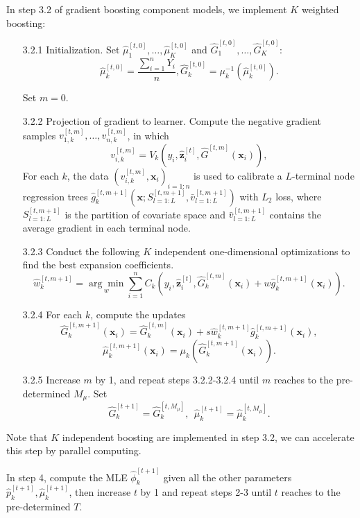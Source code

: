 \documentclass[11pt]{article}
\numberwithin{equation}{section}
\def\bx{\boldsymbol{x}}
\def\bz{\boldsymbol{z}}
\newcounter{saveenumi}
\newcommand{\seti}{\setcounter{saveenumi}{\value{enumi}}}
\begin{document}
In step 3.2 of gradient boosting component models, we implement $K$ weighted boosting:
	\begin{enumerate}
		\item[3.2.1] Initialization. Set $\hat{\mu}_1^{[t,0]},\ldots,\hat{\mu}_K^{[t,0]}$ and $\hat{G}_1^{[t,0]},\ldots,\hat{G}_K^{[t,0]}$:
			\begin{equation}\label{ini-2}
				\hat{\mu}_k^{[t,0]}=\frac{\sum_{i=1}^nY_i}{n}, \hat{G}_k^{[t,0]}=\mu_k^{-1}(\hat{\mu}_k^{[t,0]}).
			\end{equation}
		
		Set $m=0$.
		\item[3.2.2] Projection of gradient to learner.
		Compute the negative gradient samples $v_{1,k}^{[t,m]},\ldots,v_{n,k}^{[t,m]}$, in which
		$$v_{i,k}^{[t,m]}=V_k(y_i,\hat{\bz}^{[t]}_{i},\hat{G}^{[t,m]}(\bx_i)),$$
		For each $k$, the data $(v_{i,k}^{[t,m]},\bx_i)_{i=1:n}$ is used to calibrate a $L$-terminal node regression trees $\hat{g}_k^{[t,m+1]}\left(\bx;S^{[t,m+1]}_{l=1:L},\bar{v}^{[t,m+1]}_{l=1:L}\right)$ with $L_2$ loss, where $S^{[t,m+1]}_{l=1:L}$ is the partition of covariate space and $\bar{v}^{[t,m+1]}_{l=1:L}$ contains the average gradient in each terminal node.
		
	
	
		\item[3.2.3]  Conduct the following $K$ independent one-dimensional optimizations to find the best expansion coefficients.
		$$\hat{w}_{k}^{[t,m+1]}=\underset{w}{\arg\min}\sum_{i=1}^n C_{k}(y_i,\hat{\bz}_i^{[t]},\hat{G}_k^{[t,m]}(\bx_i)+w\hat{g}_k^{[t,m+1]}(\bx_i)).$$
		
		\item[3.2.4]  For each $k$, compute the updates
		$$\hat{G}_k^{[t,m+1]}(\bx_i)=\hat{G}_k^{[t,m]}(\bx_i)+s\hat{w}_{k}^{[t,m+1]}\hat{g}_{k}^{[t,m+1]}(\bx_i),$$
		$$\hat{\mu}_k^{[t,m+1]}(\bx_i)=\mu_k(\hat{G}_k^{[t,m+1]}(\bx_i)).$$
		\seti


		\item[3.2.5] Increase $m$ by 1, and repeat steps 3.2.2-3.2.4 until $m$ reaches to the pre-determined $M_\mu$. Set
		$$\hat{G}_k^{[t+1]}=\hat{G}_k^{[t,M_\mu]},~~\hat{\mu}_k^{[t+1]}=\hat{\mu}_k^{[t,M_\mu]}.$$
	\end{enumerate}
Note that $K$ independent boosting are implemented in step 3.2, we can accelerate this step by parallel computing.
	
In step 4, 
compute the MLE $\hat{\phi}_k^{[t+1]}$ given all the other parameters $\hat{p}_k^{[t+1]}, \hat{\mu}_k^{[t+1]}$, then increase $t$ by 1 and repeat steps 2-3 until $t$
		reaches to the pre-determined $T$.
		
\end{document}
